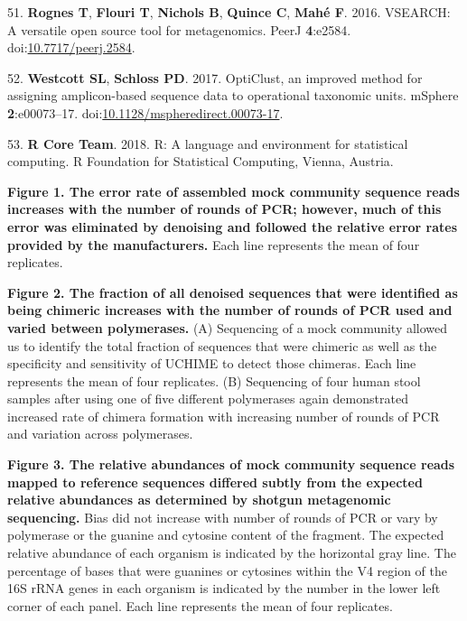 \documentclass[11pt,]{article}
\begin{document}
\leavevmode\hypertarget{ref-Rognes2016}{}%
51. \textbf{Rognes T}, \textbf{Flouri T}, \textbf{Nichols B},
\textbf{Quince C}, \textbf{Mahé F}. 2016. VSEARCH: A versatile open
source tool for metagenomics. PeerJ \textbf{4}:e2584.
doi:\href{https://doi.org/10.7717/peerj.2584}{10.7717/peerj.2584}.

\leavevmode\hypertarget{ref-Westcott2017}{}%
52. \textbf{Westcott SL}, \textbf{Schloss PD}. 2017. OptiClust, an
improved method for assigning amplicon-based sequence data to
operational taxonomic units. mSphere \textbf{2}:e00073--17.
doi:\href{https://doi.org/10.1128/mspheredirect.00073-17}{10.1128/mspheredirect.00073-17}.

\leavevmode\hypertarget{ref-r_citation_2018}{}%
53. \textbf{R Core Team}. 2018. R: A language and environment for
statistical computing. R Foundation for Statistical Computing, Vienna,
Austria.

\newpage

\textbf{Figure 1. The error rate of assembled mock community sequence
reads increases with the number of rounds of PCR; however, much of this
error was eliminated by denoising and followed the relative error rates
provided by the manufacturers.} Each line represents the mean of four
replicates.

\textbf{Figure 2. The fraction of all denoised sequences that were
identified as being chimeric increases with the number of rounds of PCR
used and varied between polymerases.} (A) Sequencing of a mock community
allowed us to identify the total fraction of sequences that were
chimeric as well as the specificity and sensitivity of UCHIME to detect
those chimeras. Each line represents the mean of four replicates. (B)
Sequencing of four human stool samples after using one of five different
polymerases again demonstrated increased rate of chimera formation with
increasing number of rounds of PCR and variation across polymerases.

\textbf{Figure 3. The relative abundances of mock community sequence
reads mapped to reference sequences differed subtly from the expected
relative abundances as determined by shotgun metagenomic sequencing.}
Bias did not increase with number of rounds of PCR or vary by polymerase
or the guanine and cytosine content of the fragment. The expected
relative abundance of each organism is indicated by the horizontal gray
line. The percentage of bases that were guanines or cytosines within the
V4 region of the 16S rRNA genes in each organism is indicated by the
number in the lower left corner of each panel. Each line represents the
mean of four replicates.
\end{document}
